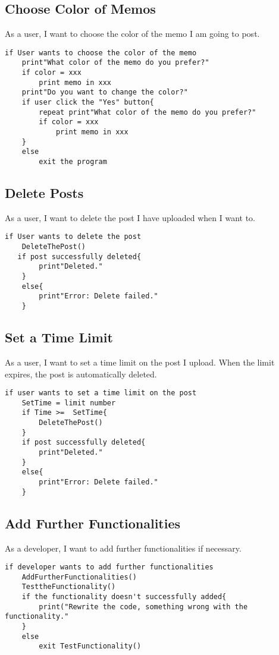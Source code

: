 \documentclass[conference]{IEEEtran}
\numberwithin{figure}{subsection}
\begin{document}
\subsection{Choose Color of Memos}
As a user, I want to choose the color of the memo I am going to post.\\
\begin{lstlisting}
if User wants to choose the color of the memo
	print"What color of the memo do you prefer?"
	if color = xxx
		print memo in xxx
    print"Do you want to change the color?"
    if user click the "Yes" button{
    	repeat print"What color of the memo do you prefer?"
   		if color = xxx
    		print memo in xxx
    }
    else 
    	exit the program
\end{lstlisting}

\subsection{Delete Posts}
As a user, I want to delete the post I have uploaded when I want to. \\
\begin{lstlisting}
if User wants to delete the post
	DeleteThePost()
   if post successfully deleted{
		print"Deleted."
	}
	else{
		print"Error: Delete failed."
	}
\end{lstlisting}

\subsection{Set a Time Limit}
As a user, I want to set a time limit on the post I upload. When the limit expires, the post is automatically deleted. \\
\begin{lstlisting}
if user wants to set a time limit on the post
	SetTime = limit number
	if Time >=  SetTime{
		DeleteThePost()
	}
    if post successfully deleted{
		print"Deleted."
	}
	else{
		print"Error: Delete failed."
	}
\end{lstlisting}

\subsection{Add Further Functionalities}
As a developer, I want to add further functionalities if necessary.\\
\begin{lstlisting}
if developer wants to add further functionalities
	AddFurtherFunctionalities()
	TesttheFunctionality()
	if the functionality doesn't successfully added{
    	print("Rewrite the code, something wrong with the functionality."
    }
    else
    	exit TestFunctionality()
    	
\end{lstlisting}
\end{document}
